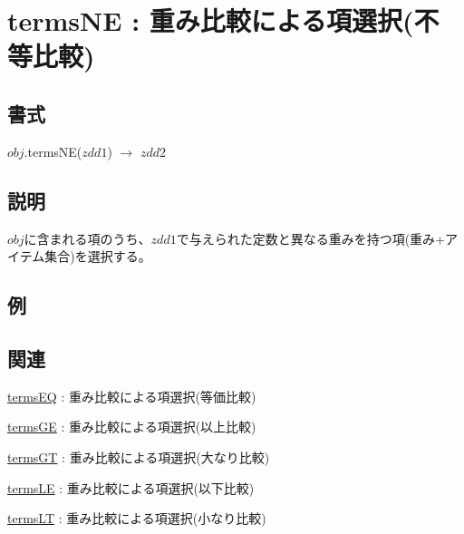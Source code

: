 
\section{termsNE : 重み比較による項選択(不等比較)\label{sect:termsNE}}
\subsection*{書式}
$obj$.termsNE($zdd1$) $\rightarrow$ $zdd2$

\subsection*{説明}
$obj$に含まれる項のうち、$zdd1$で与えられた定数と異なる重みを持つ項(重み+アイテム集合)を選択する。

\subsection*{例}


\subsection*{関連}
\hyperref[sect:termsEQ]{termsEQ} : 重み比較による項選択(等価比較)

\hyperref[sect:termsGE]{termsGE} : 重み比較による項選択(以上比較)

\hyperref[sect:termsGT]{termsGT} : 重み比較による項選択(大なり比較)

\hyperref[sect:termsLE]{termsLE} : 重み比較による項選択(以下比較)

\hyperref[sect:termsLT]{termsLT} : 重み比較による項選択(小なり比較)

